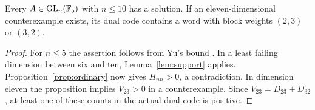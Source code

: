 \begin{corollary}\label{cor:ten}
Every $A\in\operatorname{GL}_n(\mathbb F_5)$ with $n\le10$ has a solution. If an eleven-dimensional counterexample exists, its dual code contains a word with block weights $(2,3)$ or $(3,2)$.
\end{corollary}
\begin{proof}
For $n\le5$ the assertion follows from Yu's bound \cite{yu}. In a least failing dimension between six and ten, Lemma~\ref{lem:support} applies. Proposition~\ref{prop:ordinary} now gives $H_{nn}>0$, a contradiction. In dimension eleven the proposition implies $V_{23}>0$ in a counterexample. Since $V_{23}=D_{23}+D_{32}$, at least one of these counts in the actual dual code is positive.
\end{proof}
